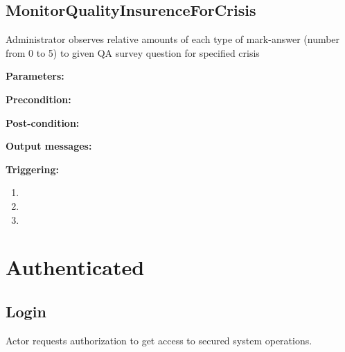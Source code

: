 \subsection{MonitorQualityInsurenceForCrisis}

Administrator observes relative amounts of each type of mark-answer
(number from 0 to 5) to given QA survey question for specified crisis

\begin{description}

\item \textbf{Parameters:} 
\item \textbf{Precondition:}
\item \textbf{Post-condition:}
\item \textbf{Output messages:}

\item \textbf{Triggering:}
\begin{enumerate}
\item
\item
\item
\end{enumerate}

\end{description}

\section{Authenticated}

\subsection{Login}

Actor requests authorization to get access to secured system operations.

